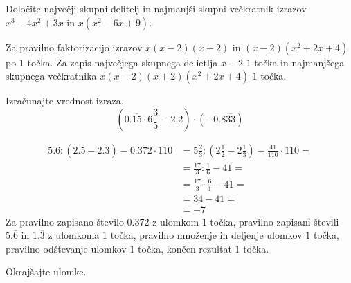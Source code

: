 \documentclass[addpoints]{exam}
\begin{document}
\begin{questions}



    \question[4]
    Določite največji skupni delitelj in najmanjši skupni večkratnik izrazov $x^3-4x^2+3x$ in $x(x^2-6x+9)$.

    \begin{solution}[7cm]
        Za pravilno faktorizacijo izrazov $x(x-2)(x+2)$ in $(x-2)(x^2+2x+4)$ po $1$ točka. 
        Za zapis največjega skupnega delietlja $x-2$ $1$ točka in najmanjšega skupnega večkratnika $x(x-2)(x+2)(x^2+2x+4)$ $1$ točka.
    \end{solution}
    

    

    \question[5]
    Izračunajte vrednost izraza.
        $$\left(0.\overline{15}\cdot 6\frac{3}{5}-2.2\right)\cdot\left(-0.8\overline{33}\right) $$

        \begin{solution}[4cm]
            \begin{align*}
                5.\overline{6}:(2.5-2.\overline{3}) - 0.3\overline{72}\cdot 110&=5\frac{2}{3}:(2\frac{1}{2}-2\frac{1}{3})- \frac{41}{110}\cdot 110 = \\
                                                                            &=\frac{17}{3}:\frac{1}{6}-41= \\
                                                                            &=\frac{17}{3}\cdot \frac{6}{1}-41= \\
                                                                            &=34-41= \\
                                                                            &= -7
            \end{align*}
            Za pravilno zapisano število $0.3\overline{72}$ z ulomkom $1$ točka, pravilno zapisani števili $5.\overline{6}$ in $1.\overline{3}$ z ulomkoma $1$ točka, pravilno množenje in deljenje ulomkov $1$ točka, pravilno odštevanje ulomkov $1$ točka, končen rezultat $1$ točka.
        \end{solution}




    \newpage

    \question
    Okrajšajte ulomke.
\end{questions}
\end{document}
